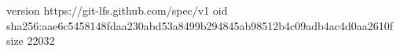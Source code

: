 version https://git-lfs.github.com/spec/v1
oid sha256:aae6c5458148fdaa230abd53a8499b294845ab98512b4c09adb4ac4d0aa2610f
size 22032
